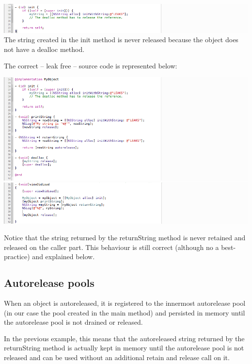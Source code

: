 \documentclass[a4paper,10pt]{article}
\begin{document}
		\begin{center}
			\includegraphics[width=1\textwidth]{./images/init_noleak.png}
			The string created in the init method is never released because the object does not have a dealloc method.
		\end{center}
		
		The correct -- leak free -- source code is represented below:
		\begin{center}
		\includegraphics[width=1\textwidth]{./images/object_ok.png}
		\includegraphics[width=1\textwidth]{./images/caller_ok.png}
		\end{center}
		
		Notice that the string returned by the returnString method is never retained and released on the caller part. This behaviour is still correct (although no a best-practice) and explained below.
		
		\subsection{Autorelease pools}
			
		When an object is autoreleased, it is registered to the innermost autorelease pool (in our case the pool created in the main method) and persisted in memory until the autorelease pool is not drained or released.
		
		In the previous example, this means that the autoreleased string returned by the returnString method is actually kept in memory until the autorelease pool is not released and can be used without an additional retain and release call on it.
		
\end{document}
